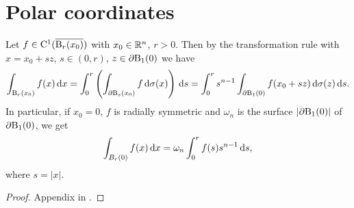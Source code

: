 

\section{Polar coordinates}

Let $f \in \mathrm{C}^1(\overline{\mathrm{B}_r(x_0)})$ with $x_0 \in \mathbb{R}^n$, $r > 0$. Then by the transformation rule with $x = x_0 + sz$, $s \in (0,r)$, $z \in \partial \mathrm{B}_1(0)$ we have
$$
\int_{\mathrm{B}_r(x_0)} f(x) \, {\operatorname{d}\!{x}} = \int_0^r \left( \int_{\partial \mathrm{B}_s(x_0)} f \, {\operatorname{d}\!{\sigma}}(x) \right) \, {\operatorname{d}\!{s}} = \int_0^r s^{n - 1} \int_{\partial \mathrm{B}_1(0)} f(x_0 + sz) \, {\operatorname{d}\!{\sigma}}(z) \, {\operatorname{d}\!{s}}.
$$
In particular, if $x_0 = 0$, $f$ is radially symmetric and $\omega_n$ is the surface $|\partial \mathrm{B}_1(0)|$ of $\partial \mathrm{B}_1(0)$, we get
$$
\int_{B_r(0)} f(x) \, {\operatorname{d}\!{x}} = \omega_n \int_0^r f(s) s^{n - 1} \, {\operatorname{d}\!{s}},
$$
where $s = |x|$.

\begin{proof}
  Appendix in \cite{evans2010partial}.
\end{proof}
